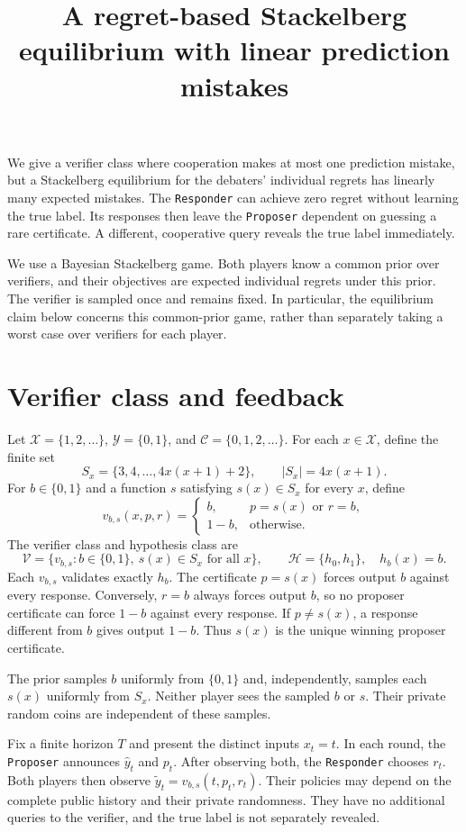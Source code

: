\documentclass[11pt]{article}
\title{A regret-based Stackelberg equilibrium with linear prediction mistakes}
\author{}
\date{}
\newcommand{\X}{\mathcal X}
\newcommand{\Y}{\mathcal Y}
\newcommand{\C}{\mathcal C}
\renewcommand{\H}{\mathcal H}
\newcommand{\V}{\mathcal V}
\newcommand{\hy}{\hat y}
\newcommand{\vy}{\tilde y}
\newcommand{\dt}{\texttt{Proposer}\xspace}
\newcommand{\df}{\texttt{Responder}\xspace}
\begin{document}
\maketitle

We give a verifier class where cooperation makes at most one prediction
mistake, but a Stackelberg equilibrium for the debaters' individual regrets
has linearly many expected mistakes. The \df can achieve zero regret
without learning the true label. Its responses then leave the \dt dependent
on guessing a rare certificate. A different, cooperative query reveals the
true label immediately.

We use a Bayesian Stackelberg game. Both players know a common prior over
verifiers, and their objectives are expected individual regrets under this
prior. The verifier is sampled once and remains fixed. In particular, the
equilibrium claim below concerns this common-prior game, rather than
separately taking a worst case over verifiers for each player.

\section{Verifier class and feedback}

Let $\X=\{1,2,\ldots\}$, $\Y=\{0,1\}$, and
$\C=\{0,1,2,\ldots\}$. For each $x\in\X$, define the finite set
\[
S_x=\{3,4,\ldots,4x(x+1)+2\},
\qquad |S_x|=4x(x+1).
\]
For $b\in\{0,1\}$ and a function $s$ satisfying $s(x)\in S_x$ for every
$x$, define
\[
v_{b,s}(x,p,r)=
\begin{cases}
b, & p=s(x)\text{ or }r=b,\\
1-b, & \text{otherwise}.
\end{cases}
\]
The verifier class and hypothesis class are
\[
\V=\{v_{b,s}:b\in\{0,1\},\ s(x)\in S_x\text{ for all }x\},
\qquad
\H=\{h_0,h_1\},\quad h_b(x)=b.
\]
Each $v_{b,s}$ validates exactly $h_b$. The certificate $p=s(x)$ forces
output $b$ against every response. Conversely, $r=b$ always forces output
$b$, so no proposer certificate can force $1-b$ against every response.
If $p\ne s(x)$, a response different from $b$ gives output $1-b$.
Thus $s(x)$ is the unique winning proposer certificate.

The prior samples $b$ uniformly from $\{0,1\}$ and, independently,
samples each $s(x)$ uniformly from $S_x$. Neither player sees the sampled
$b$ or $s$. Their private random coins are independent of these samples.

Fix a finite horizon $T$ and present the distinct inputs $x_t=t$. In each
round, the \dt announces $\hy_t$ and $p_t$. After observing both, the \df
chooses $r_t$. Both players then observe
$\vy_t=v_{b,s}(t,p_t,r_t)$. Their policies may depend on the complete
public history and their private randomness. They have no additional
queries to the verifier, and the true label is not separately revealed.
\end{document}
